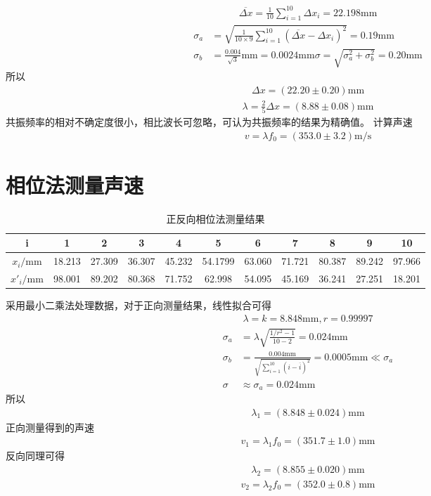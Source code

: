 \documentclass[a4paper]{ctexart}
\begin{document}
	\begin{align}
		\overline{\Delta x}=\frac{1}{10}\sum_{i=1}^{10}\Delta x_i=22.198\mathrm{mm}
	\end{align}
	\begin{align}
		\sigma_a&=\sqrt{\frac{1}{10\times9}\sum_{i=1}^{10}(\overline{\Delta x}-\Delta x_i)^2}=0.19\mathrm{mm}\\
		\sigma_b&=\frac{0.004}{\sqrt{3}}\mathrm{mm}=0.0024\mathrm{mm}
		\sigma=\sqrt{\sigma_a^2+\sigma_b^2}=0.20\mathrm{mm}
	\end{align}
	所以
	\begin{align}
		\Delta x=(22.20\pm0.20)\mathrm{mm}
	\end{align}
	\begin{align}
		\lambda=\frac{2}{5}\Delta x=(8.88\pm 0.08)\mathrm{mm}
	\end{align}
	共振频率的相对不确定度很小，相比波长可忽略，可认为共振频率的结果为精确值。
	计算声速
	\begin{align}
		v=\lambda f_0=(353.0\pm3.2)\mathrm{m/s}
	\end{align}
	\section{相位法测量声速}
	\begin{table}[H]
		\begin{center}
			\caption{正反向相位法测量结果}
			\begin{tabular}{c|cccccccccc}
				i&1&2&3&4&5&6&7&8&9&10\\
				\hline
				$x_i/\mathrm{mm}$&18.213&27.309&36.307&45.232&54.1799&63.060&71.721&80.387&89.242&97.966\\
				\hline
				$x'_i/\mathrm{mm}$&98.001&89.202&80.368&71.752&62.998&54.095&45.169&36.241&27.251&18.201
			\end{tabular}
		\end{center}
	\end{table}
	采用最小二乘法处理数据，对于正向测量结果，线性拟合可得
	\begin{align}
		\lambda=k=8.848\mathrm{mm},r=0.99997
	\end{align}
	\begin{align}
		\sigma_a&=\lambda\sqrt{\frac{1/r^2-1}{10-2}}=0.024\mathrm{mm}\\
		\sigma_b&=\frac{0.004\mathrm{mm}}{\sqrt{\sum_{i=1}^{10}(i-\overline{i})^2}}=0.0005\mathrm{mm}\ll \sigma_a\\
		\sigma&\approx\sigma_a=0.024\mathrm{mm}
	\end{align}
	所以
	\begin{align}
		\lambda_1=(8.848\pm0.024)\mathrm{mm}
	\end{align}
	正向测量得到的声速
	\begin{align}
		v_1=\lambda_1 f_0=(351.7\pm1.0)\mathrm{mm}
	\end{align}
	反向同理可得
	\begin{align}
		\lambda_2=(8.855\pm0.020)\mathrm{mm}
	\end{align}
	\begin{align}
		v_2=\lambda_2 f_0=(352.0\pm0.8)\mathrm{mm}
	\end{align}
\end{document}

